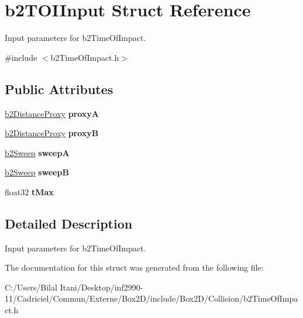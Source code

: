 \hypertarget{structb2_t_o_i_input}{}\section{b2\+T\+O\+I\+Input Struct Reference}
\label{structb2_t_o_i_input}


Input parameters for b2\+Time\+Of\+Impact.  




{\ttfamily \#include $<$b2\+Time\+Of\+Impact.\+h$>$}

\subsection*{Public Attributes}
\begin{DoxyCompactItemize}
\item 
\hyperlink{structb2_distance_proxy}{b2\+Distance\+Proxy} {\bfseries proxyA}\hypertarget{structb2_t_o_i_input_a5c5fb931435d92ac2d2080552400cd57}{}\label{structb2_t_o_i_input_a5c5fb931435d92ac2d2080552400cd57}

\item 
\hyperlink{structb2_distance_proxy}{b2\+Distance\+Proxy} {\bfseries proxyB}\hypertarget{structb2_t_o_i_input_a7f4e614d1c574006402e9610c984a93f}{}\label{structb2_t_o_i_input_a7f4e614d1c574006402e9610c984a93f}

\item 
\hyperlink{structb2_sweep}{b2\+Sweep} {\bfseries sweepA}\hypertarget{structb2_t_o_i_input_adf63a4b9969aa839c2d520bf6d76148a}{}\label{structb2_t_o_i_input_adf63a4b9969aa839c2d520bf6d76148a}

\item 
\hyperlink{structb2_sweep}{b2\+Sweep} {\bfseries sweepB}\hypertarget{structb2_t_o_i_input_af506b6adc7eca852f08460ec76c7b9a7}{}\label{structb2_t_o_i_input_af506b6adc7eca852f08460ec76c7b9a7}

\item 
float32 {\bfseries t\+Max}\hypertarget{structb2_t_o_i_input_a365a434996de60957777a673918d3a5f}{}\label{structb2_t_o_i_input_a365a434996de60957777a673918d3a5f}

\end{DoxyCompactItemize}


\subsection{Detailed Description}
Input parameters for b2\+Time\+Of\+Impact. 

The documentation for this struct was generated from the following file\+:\begin{DoxyCompactItemize}
\item 
C\+:/\+Users/\+Bilal Itani/\+Desktop/inf2990-\/11/\+Cadriciel/\+Commun/\+Externe/\+Box2\+D/include/\+Box2\+D/\+Collision/b2\+Time\+Of\+Impact.\+h\end{DoxyCompactItemize}
